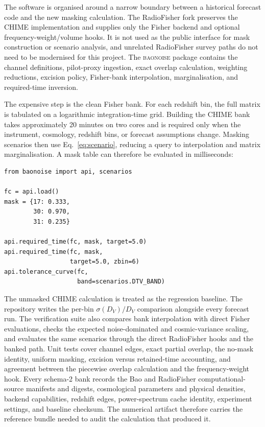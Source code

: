 The software is organised around a narrow boundary between a historical
forecast code and the new masking calculation. The RadioFisher fork
preserves the CHIME implementation and supplies only the Fisher backend
and optional frequency-weight/volume hooks. It is not used as the
public interface for mask construction or scenario analysis, and
unrelated RadioFisher survey paths do not need to be modernised for
this project. The \textsc{baonoise} package contains the channel
definitions, pilot-proxy ingestion, exact overlap calculation,
weighting reductions, excision policy, Fisher-bank interpolation,
marginalisation, and required-time inversion.

The expensive step is the clean Fisher bank. For each redshift bin, the
full matrix is tabulated on a logarithmic integration-time grid.
Building the CHIME bank takes approximately 20 minutes on two cores and
is required only when the instrument, cosmology, redshift bins, or
forecast assumptions change. Masking scenarios then use
Eq.~\eqref{eq:scenario}, reducing a query to interpolation and matrix
marginalisation. A mask table can therefore be evaluated in
milliseconds:

\begin{verbatim}
from baonoise import api, scenarios

fc = api.load()
mask = {17: 0.333,
        30: 0.970,
        31: 0.235}

api.required_time(fc, mask, target=5.0)
api.required_time(fc, mask,
                  target=5.0, zbin=6)
api.tolerance_curve(fc,
                    band=scenarios.DTV_BAND)
\end{verbatim}

The unmasked CHIME calculation is treated as the regression baseline.
The repository writes the per-bin $\sigma(D_V)/D_V$ comparison
alongside every forecast run. The verification suite also compares bank
interpolation with direct Fisher evaluations, checks the expected
noise-dominated and cosmic-variance scaling, and evaluates the same
scenarios through the direct RadioFisher hooks and the banked path.
Unit tests cover channel edges, exact partial overlap, the no-mask
identity, uniform masking, excision versus retained-time accounting,
and agreement between the piecewise overlap calculation and the
frequency-weight hook. Every schema-2 bank records the Bao and
RadioFisher computational-source manifests and digests, cosmological
parameters and physical densities, backend capabilities, redshift edges,
power-spectrum cache identity, experiment settings, and baseline checksum.
The numerical artifact therefore carries the reference bundle needed to
audit the calculation that produced it.

